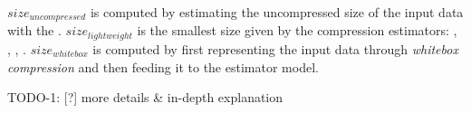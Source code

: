 \(size_{uncompressed}\) is computed by estimating the uncompressed size of the input data with the . \(size_{lightweight}\) is the smallest size given by the compression estimators: , , , . \(size_{whitebox}\) is computed by first representing the input data through \textit{whitebox compression} and then feeding it to the estimator model.

TODO-1: [?] more details \& in-depth explanation

